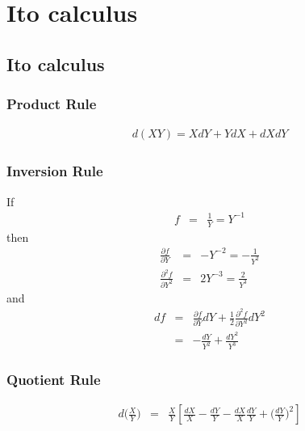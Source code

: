 \chapter{Ito calculus}

\section{Ito calculus}

\subsection{Product Rule}

\begin{eqnarray}
d(XY) = XdY + YdX +dX dY
\end{eqnarray}

\subsection{Inversion Rule}
If
\begin{eqnarray}
	f &=& \frac{1}{Y} = Y^{-1}
\end{eqnarray}
then
\begin{eqnarray}
	\frac{\partial f}{\partial Y} &=& -Y^{-2} = -\frac{1}{Y^{2}}\\
	\frac{\partial ^{2}f}{\partial Y^{2}} &=& 2Y^{-3} = \frac{2}{Y^{3}}
\end{eqnarray}
and
\begin{eqnarray}
	\nonumber
	df &=& \frac{\partial f}{\partial Y}dY + \frac{1}{2}\frac{\partial^{2}f}{\partial Y^{2}}dY^{2}\\
	&=& -\frac{dY}{Y^{2}} + \frac{dY^{2}}{Y^{3}}
\end{eqnarray}

\subsection{Quotient Rule}
\begin{eqnarray}
d\bigg(\frac{X}{Y}\bigg) &=& \frac{X}{Y}\left[\frac{dX}{X} - \frac{dY}{Y} - \frac{dX}{X}\frac{dY}{Y} + \Bigg(\frac{dY}{Y}\Bigg)^{2}\right]
\end{eqnarray}


